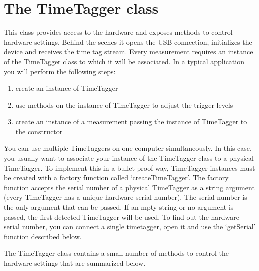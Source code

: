 \documentclass[letterpaper,10pt,english]{sphinxmanual}
\begin{document}
\section{The TimeTagger class}
\label{sections/api:the-timetagger-class}
This class provides access to the hardware and exposes methods to control hardware settings.
Behind the scenes it opens the USB connection, initializes the device
and receives the time tag stream. Every measurement requires an
instance of the TimeTagger class to which it will be associated. In a typical application
you will perform the following steps:
\begin{enumerate}
\item {} 
create an instance of TimeTagger

\item {} 
use methods on the instance of TimeTagger to adjust the trigger levels

\item {} 
create an instance of a measurement passing the instance of TimeTagger to the constructor

\end{enumerate}

You can use multiple TimeTaggers on one computer simultaneously. In this case, you usually want to
associate your instance of the TimeTagger class to a physical TimeTagger. To
implement this in a bullet proof way, TimeTagger instances must be created
with a factory function called `createTimeTagger'. The factory function accepts
the serial number of a physical TimeTagger as a string argument (every
TimeTagger has a unique hardware serial number). The serial number is the only argument that can
be passed. If an mpty string or no argument is passed, the first detected
TimeTagger will be used. To find out the hardware serial number, you can connect
a single timetagger, open it and use the `getSerial' function described below.

The TimeTagger class contains a small number of methods to control the hardware settings that are summarized below.
\end{document}
